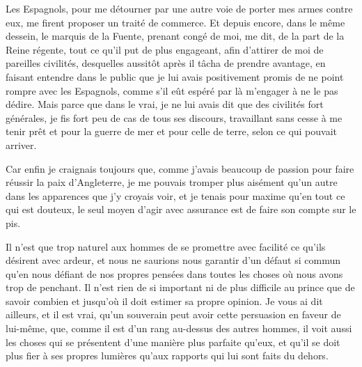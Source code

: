 \documentclass[french,twoside]{book} %
\begin{document}
Les Espagnols, pour me détourner par une autre voie de porter mes armes contre eux, me firent proposer un traité de commerce. Et depuis encore, dans le même dessein, le marquis de la Fuente, prenant congé de moi, me dit, de la part de la Reine régente, tout ce qu’il put de plus engageant, afin d’attirer de moi de pareilles civilités, desquelles aussitôt après il tâcha de prendre avantage, en faisant entendre dans le public que je lui avais positivement promis de ne point rompre avec les Espagnols, comme s’il eût espéré par là m’engager à ne le pas dédire. Mais parce que dans le vrai, je ne lui avais dit que des civilités fort générales, je fis fort peu de cas de tous ses discours, travaillant sans cesse à me tenir prêt et pour la guerre de mer et pour celle de terre, selon ce qui pouvait arriver.\par
Car enfin je craignais toujours que, comme j’avais beaucoup de passion pour faire réussir la paix d’Angleterre, je me pouvais tromper plus aisément qu’un autre dans les apparences que j’y croyais voir, et je tenais pour maxime qu’en tout ce qui est douteux, le seul moyen d’agir avec assurance est de faire son compte sur le pis.\par
Il n’est que trop naturel aux hommes de se promettre avec facilité ce qu’ils désirent avec ardeur, et nous ne saurions nous garantir d’un défaut si commun qu’en nous défiant de nos propres pensées dans toutes les choses où nous avons trop de penchant. Il n’est rien de si important ni de plus difficile au prince que de savoir combien et jusqu’où il doit estimer sa propre opinion. Je vous ai dit ailleurs, et il est vrai, qu’un souverain peut avoir cette persuasion en faveur de lui-même, que, comme il est d’un rang au-dessus des autres hommes, il voit aussi les choses qui se présentent d’une manière plus parfaite qu’eux, et qu’il se doit plus fier à ses propres lumières qu’aux rapports qui lui sont faits du dehors.\par
\end{document}
